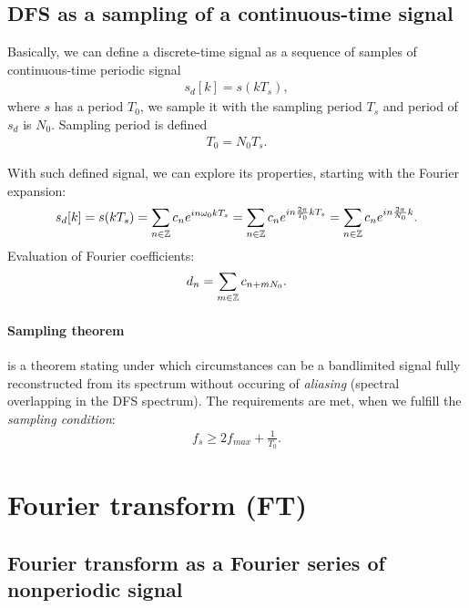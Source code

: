\documentclass[11pt,a4paper]{report}
\theoremstyle{remark}
\theoremstyle{definition}
\begin{document}
				\subsection{DFS as a sampling of a continuous-time signal}
					Basically, we can define a discrete-time signal as a sequence of samples of continuous-time periodic signal
					\begin{align}
						s_d[k] = s(kT_s),
					\end{align}
					where $s$ has a period $T_0$, we sample it with the sampling period $T_s$ and period of $s_d$ is $N_0$. Sampling period is defined
					\begin{align}
						\label{def:sampleper}
						T_0 = N_0 T_s.
					\end{align}
					
					With such defined signal, we can explore its properties, starting with the Fourier expansion:
					\begin{align}
						s_d[k] = s(kT_s) = \sum_{n \in {\mathbb Z}} c_n e^{i n \omega_0 kT_s} = \sum_{n \in {\mathbb Z}} c_n e^{i n \frac{2 \pi}{T_0} kT_s} = \sum_{n \in {\mathbb Z}} c_n e^{i n \frac{2 \pi}{N_0} k}.
					\end{align}
					Evaluation of Fourier coefficients:
					\begin{align}
						d_n = \sum_{m \in {\mathbb Z}} c_{n+mN_0}.
					\end{align}
					
					\paragraph{Sampling theorem} is a theorem stating under which circumstances can be a bandlimited signal fully reconstructed from its spectrum without occuring of \textit{aliasing} (spectral overlapping in the DFS spectrum). The requirements are met, when we fulfill the \textit{sampling condition}:
					\begin{align}
						f_s \geq 2 f_{max} + \frac{1}{T_0}.
					\end{align}
					
				
			\section{Fourier transform (FT)}
					
				\subsection{Fourier transform as a Fourier series of nonperiodic signal}
					
\end{document}
